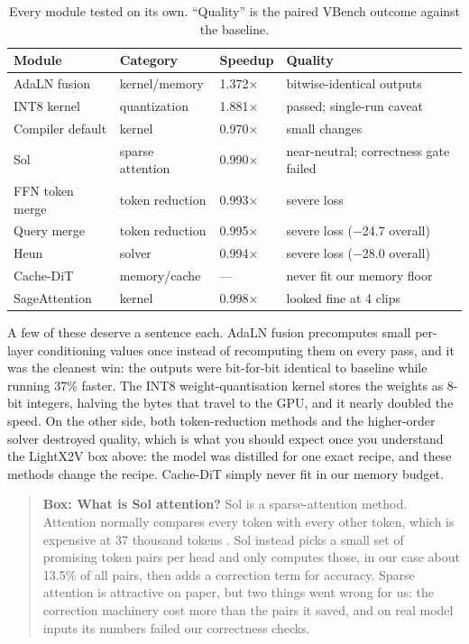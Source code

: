 \begin{table}[ht]
\centering
\caption{Every module tested on its own. ``Quality'' is the paired VBench outcome against the baseline.}\label{tab:modules}
\begin{tabular}{llll}
\toprule
Module & Category & Speedup & Quality\\
\midrule
AdaLN fusion & kernel/memory & 1.372$\times$ & bitwise-identical outputs\\
INT8 kernel & quantization & 1.881$\times$ & passed; single-run caveat\\
Compiler default & kernel & 0.970$\times$ & small changes\\
Sol & sparse attention & 0.990$\times$ & near-neutral; correctness gate failed\\
FFN token merge & token reduction & 0.993$\times$ & severe loss\\
Query merge & token reduction & 0.995$\times$ & severe loss ($-$24.7 overall)\\
Heun & solver & 0.994$\times$ & severe loss ($-$28.0 overall)\\
Cache-DiT & memory/cache & --- & never fit our memory floor\\
SageAttention & kernel & 0.998$\times$ & looked fine at 4 clips\\
\bottomrule
\end{tabular}
\end{table}

A few of these deserve a sentence each. AdaLN fusion precomputes small per-layer conditioning values once instead of recomputing them on every pass, and it was the cleanest win: the outputs were bit-for-bit identical to baseline while running 37\% faster. The INT8 weight-quantisation kernel stores the weights as 8-bit integers, halving the bytes that travel to the GPU, and it nearly doubled the speed. On the other side, both token-reduction methods \citep{bolya2023tome} and the higher-order solver \citep{hairer1993ode} destroyed quality, which is what you should expect once you understand the LightX2V box above: the model was distilled for one exact recipe, and these methods change the recipe. Cache-DiT \citep{cachedit} simply never fit in our memory budget.

\begin{quote}
\textbf{Box: What is Sol attention?} Sol \citep{li2026solattn} is a sparse-attention method. Attention normally compares every token with every other token, which is expensive at 37 thousand tokens \citep{dao2022flashattention}. Sol instead picks a small set of promising token pairs per head and only computes those, in our case about 13.5\% of all pairs, then adds a correction term for accuracy. Sparse attention is attractive on paper, but two things went wrong for us: the correction machinery cost more than the pairs it saved, and on real model inputs its numbers failed our correctness checks.
\end{quote}

